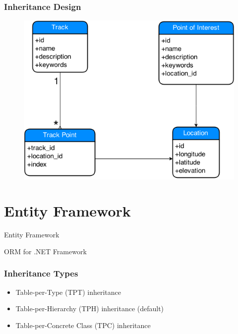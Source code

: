 \documentclass{beamer}
\begin{document}
\begin{frame}
	\frametitle{Inheritance Design}
	\begin{figure}
		\centering
		\includegraphics[scale=0.4]{resources/concise-gps.png}
	\end{figure}
\end{frame}

\section{Entity Framework}

\begin{frame}
	
	\begin{center}
		\Huge Entity Framework
	\end{center}
	\begin{center}
		ORM for .NET Framework
	\end{center}

\end{frame}

\begin{frame}
	\frametitle{Inheritance Types}
	
	\begin{itemize}
		\item Table-per-Type (TPT) inheritance
		\item Table-per-Hierarchy (TPH) inheritance (default)
		\item Table-per-Concrete Class (TPC) inheritance
	\end{itemize}

\end{frame}
\end{document}
